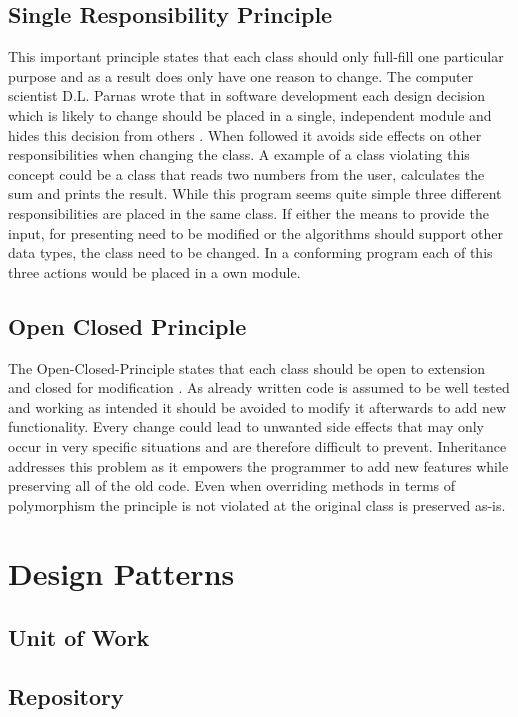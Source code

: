 \subsection{Single Responsibility Principle}
This important principle states that each class should only full-fill one particular purpose and as a result does only have one reason to change. The computer scientist D.L. Parnas wrote that in software development each design decision which is likely to change should be placed in a single, independent module and hides this decision from others \cite{srp}. When followed it avoids side effects on other responsibilities when changing the class. A example of a class violating this concept could be a class that reads two numbers from the user, calculates the sum and prints the result. While this program seems quite simple three different responsibilities are placed in the same class. If either the means to provide the input, for presenting need to be modified or the algorithms should support other data types, the class need to be changed. In a conforming program each of this three actions would be placed in a own module.

\subsection{Open Closed Principle}
The Open-Closed-Principle states that each class should be open to extension and closed for modification \cite{ocp}. As already written code is assumed to be well tested and working as intended it should be avoided to modify it afterwards to add new functionality. Every change could lead to unwanted side effects that may only occur in very specific situations and are therefore difficult to prevent. Inheritance addresses this problem as it empowers the programmer to add new features while preserving all of the old code. Even when overriding methods in terms of polymorphism the principle is not violated at the original class is preserved as-is. 

\section{Design Patterns}
\subsection{Unit of Work}
\subsection{Repository}
